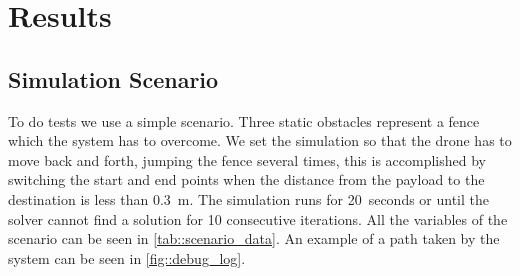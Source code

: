 %
\chapter{Results} \label{chap::results}

\section{Simulation Scenario}
To do tests we use a simple scenario. Three static obstacles represent a fence which the system has to overcome. We set the simulation so that the drone has to move back and forth, jumping the fence several times, this is accomplished by switching the start and end points when the distance from the payload to the destination is less than \SI{.3}{\meter}. The simulation runs for \SI{20}{seconds} or until the solver cannot find a solution for 10 consecutive iterations. All the variables of the scenario can be seen in \cref{tab::scenario_data}. An example of a path taken by the system can be seen in \cref{fig::debug_log}.
